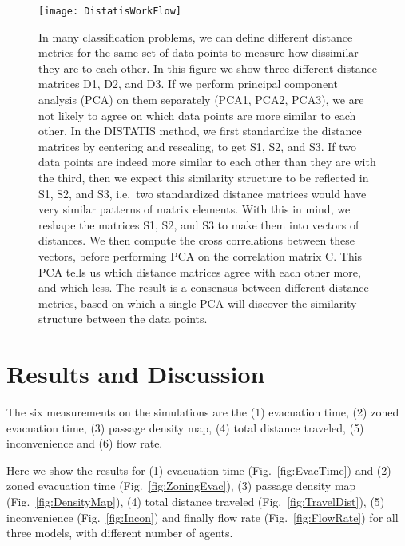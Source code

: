 \begin{figure}[htbp]
\centering
\texttt{[image: DistatisWorkFlow]}
\caption{In many classification problems, we can define different distance metrics for the same set of data points to measure how dissimilar they are to each other. In this figure we show three different distance matrices D1, D2, and D3. If we perform principal component analysis (PCA) on them separately (PCA1, PCA2, PCA3), we are not likely to agree on which data points are more similar to each other. In the DISTATIS method, we first standardize the distance matrices by centering and rescaling, to get S1, S2, and S3. If two data points are indeed more similar to each other than they are with the third, then we expect this similarity structure to be reflected in S1, S2, and S3, i.e.~two standardized distance matrices would have very similar patterns of matrix elements. With this in mind, we reshape the matrices S1, S2, and S3 to make them into vectors of distances. We then compute the cross correlations between these vectors, before performing PCA on the correlation matrix C. This PCA tells us which distance matrices agree with each other more, and which less. The result is a consensus between different distance metrics, based on which a single PCA will discover the similarity structure between the data points.}
\label{fig:DISTATIS}
\end{figure}

\section{Results and Discussion}
\label{Discussion}

The six measurements on the simulations are the (1) evacuation time, (2) zoned evacuation time, (3) passage density map, (4) total distance traveled, (5) inconvenience and (6) flow rate.

Here we show the results for (1) evacuation time (Fig.~\ref{fig:EvacTime}) and (2) zoned evacuation time (Fig.~\ref{fig:ZoningEvac}), (3) passage density map (Fig.~\ref{fig:DensityMap}), (4) total distance traveled (Fig.~\ref{fig:TravelDist}), (5) inconvenience (Fig.~\ref{fig:Incon}) and finally flow rate (Fig.~\ref{fig:FlowRate}) for all three models, with different number of agents.


